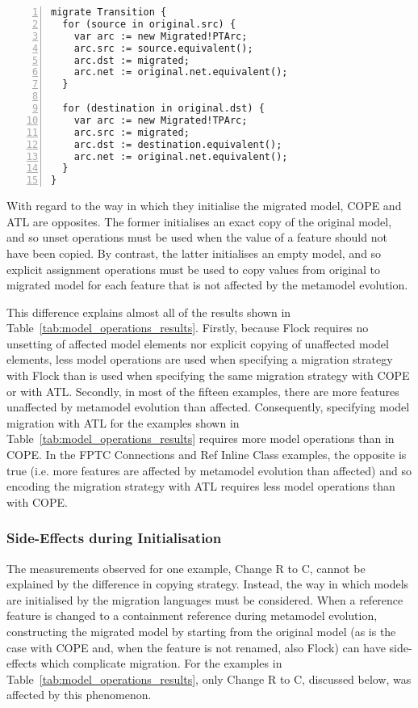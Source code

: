\begin{lstlisting}[basicstyle=\ttfamily\footnotesize, flexiblecolumns=true, numbers=left, nolol=true, caption=Petri nets model migration in Flock, label=lst:quantitive_flock, language=Flock, tabsize=2]
migrate Transition {
  for (source in original.src) {
    var arc := new Migrated!PTArc;
    arc.src := source.equivalent();
    arc.dst := migrated;
    arc.net := original.net.equivalent();
  }

  for (destination in original.dst) {
    var arc := new Migrated!TPArc;
    arc.src := migrated;
    arc.dst := destination.equivalent();
    arc.net := original.net.equivalent();
  }
}
\end{lstlisting}

With regard to the way in which they initialise the migrated model, COPE and ATL are opposites. The former initialises an exact copy of the original model, and so unset operations must be used when the value of a feature should not have been copied. By contrast, the latter initialises an empty model, and so explicit assignment operations must be used to copy values from original to migrated model for each feature that is not affected by the metamodel evolution.

This difference explains almost all of the results shown in Table~\ref{tab:model_operations_results}. Firstly, because Flock requires no unsetting of affected model elements nor explicit copying of unaffected model elements, less model operations are used when specifying a migration strategy with Flock than is used when specifying the same migration strategy with COPE or with ATL. Secondly, in most of the fifteen examples, there are more features unaffected by metamodel evolution than affected. Consequently, specifying model migration with ATL for the examples shown in Table~\ref{tab:model_operations_results} requires more model operations than in COPE. In the FPTC Connections and Ref Inline Class examples, the opposite is true (i.e. more features are affected by metamodel evolution than affected) and so encoding the migration strategy with ATL requires less model operations than with COPE. 


\subsubsection{Side-Effects during Initialisation}
The measurements observed for one example, Change R to C, cannot be explained by the difference in copying strategy. Instead, the way in which models are initialised by the migration languages must be considered. When a reference feature is changed to a containment reference during metamodel evolution, constructing the migrated model by starting from the original model (as is the case with COPE and, when the feature is not renamed, also Flock) can have side-effects which complicate migration. For the examples in Table~\ref{tab:model_operations_results}, only Change R to C, discussed below, was affected by this phenomenon.

